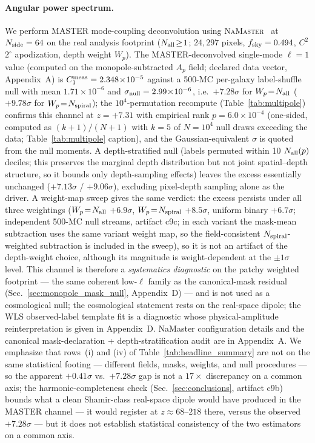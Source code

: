 \documentclass[aps,prd,twocolumn,superscriptaddress,preprintnumbers,nofootinbib,longbibliography,floatfix]{revtex4-2}
\newcommand{\sigmaunit}{\sigma}
\begin{document}
\paragraph{Angular power spectrum.}
We perform MASTER mode-coupling deconvolution using \textsc{NaMaster}~\cite{Alonso:2019} at $N_{\rm side}=64$ on the real analysis footprint ($N_{\rm all}\!\geq\!1$; $24{,}297$ pixels, $f_{\rm sky}=0.494$, $C^2$ $2^\circ$ apodization, depth weight $W_p$). The MASTER-deconvolved single-mode $\ell\!=\!1$ value (computed on the monopole-subtracted $A_p$ field; declared data vector, Appendix~A) is $C_1^{\rm meas}=2.348\!\times\!10^{-5}$ against a 500-MC per-galaxy label-shuffle null with mean $1.71\!\times\!10^{-6}$ and $\sigma_{\rm null}=2.99\!\times\!10^{-6}$, i.e.\ $+7.28\sigmaunit$ for $W_p\!=\!N_{\rm all}$ ($+9.78\sigmaunit$ for $W_p\!=\!N_{\rm spiral}$); the $10^4$-permutation recompute (Table~\ref{tab:multipole}) confirms this channel at $z=+7.31$ with empirical rank $p=6.0\times10^{-4}$ (one-sided, computed as $(k+1)/(N+1)$ with $k\!=\!5$ of $N\!=\!10^4$ null draws exceeding the data; Table~\ref{tab:multipole} caption), and the Gaussian-equivalent $\sigma$ is quoted from the null moments. A depth-stratified null (labels permuted within 10 $N_{\rm all}(p)$ deciles; this preserves the marginal depth distribution but not joint spatial--depth structure, so it bounds only depth-sampling effects) leaves the excess essentially unchanged ($+7.13\sigmaunit$ / $+9.06\sigmaunit$), excluding pixel-depth sampling alone as the driver. A weight-map sweep gives the same verdict: the excess persists under all three weightings ($W_p\!=\!N_{\rm all}$ $+6.9\sigmaunit$, $W_p\!=\!N_{\rm spiral}$ $+8.5\sigmaunit$, uniform binary $+6.7\sigmaunit$; independent 500-MC null streams, artifact c9c; in each variant the mask-mean subtraction uses the same variant weight map, so the field-consistent $N_{\rm spiral}$-weighted subtraction is included in the sweep), so it is not an artifact of the depth-weight choice, although its magnitude is weight-dependent at the $\pm1\sigmaunit$ level. This channel is therefore a \emph{systematics diagnostic} on the patchy weighted footprint --- the same coherent low-$\ell$ family as the canonical-mask residual (Sec.~\ref{sec:monopole_mask_null}, Appendix~D) --- and is not used as a cosmological null; the cosmological statement rests on the real-space dipole; the WLS observed-label template fit is a diagnostic whose physical-amplitude reinterpretation is given in Appendix~D. NaMaster configuration details and the canonical mask-declaration + depth-stratification audit are in Appendix~A. We emphasize that rows~(i) and (iv) of Table~\ref{tab:headline_summary} are not on the same statistical footing --- different fields, masks, weights, and null procedures --- so the apparent $+0.41\sigmaunit$ vs.\ $+7.28\sigmaunit$ gap is not a $17\times$ discrepancy on a common axis; the harmonic-completeness check (Sec.~\ref{sec:conclusions}, artifact c9b) bounds what a clean Shamir-class real-space dipole would have produced in the MASTER channel --- it would register at $z\approx68$--$218$ there, versus the observed $+7.28\sigmaunit$ --- but it does not establish statistical consistency of the two estimators on a common axis.
\end{document}
